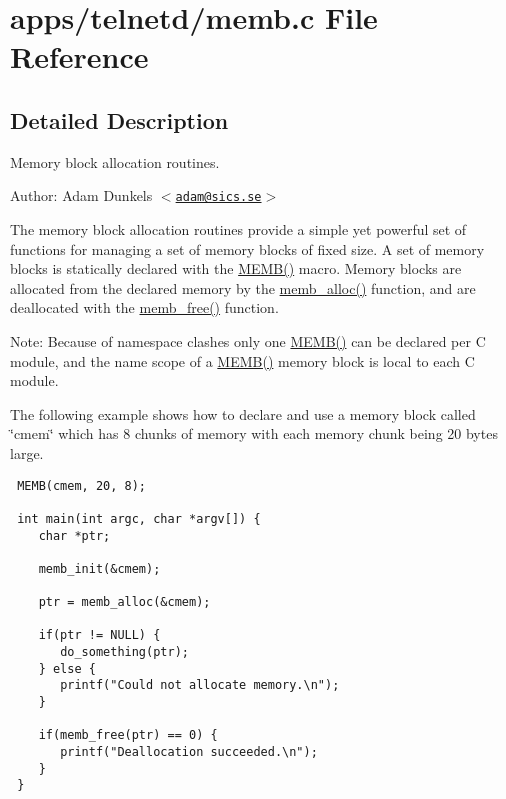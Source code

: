 \hypertarget{a00043}{
\section{apps/telnetd/memb.c File Reference}
\label{a00043}
}


\subsection{Detailed Description}
Memory block allocation routines. 

\begin{Desc}
\item[Author:]Adam Dunkels $<$\href{mailto:adam@sics.se}{\tt adam@sics.se}$>$\end{Desc}
The memory block allocation routines provide a simple yet powerful set of functions for managing a set of memory blocks of fixed size. A set of memory blocks is statically declared with the \hyperlink{a00060_g8457539d6a6eaecded820f4042b8314a}{MEMB()} macro. Memory blocks are allocated from the declared memory by the \hyperlink{a00060_g73bf7c370e6ada339f102d4c9768e48c}{memb\_\-alloc()} function, and are deallocated with the \hyperlink{a00060_g7174da2ea729ba661256d123f08ed272}{memb\_\-free()} function.

\begin{Desc}
\item[Note:]Because of namespace clashes only one \hyperlink{a00060_g8457539d6a6eaecded820f4042b8314a}{MEMB()} can be declared per C module, and the name scope of a \hyperlink{a00060_g8457539d6a6eaecded820f4042b8314a}{MEMB()} memory block is local to each C module.\end{Desc}
The following example shows how to declare and use a memory block called \char`\"{}cmem\char`\"{} which has 8 chunks of memory with each memory chunk being 20 bytes large.



\footnotesize\begin{verbatim} MEMB(cmem, 20, 8);

 int main(int argc, char *argv[]) {
    char *ptr;
    
    memb_init(&cmem);

    ptr = memb_alloc(&cmem);

    if(ptr != NULL) {
       do_something(ptr);
    } else {
       printf("Could not allocate memory.\n");
    }

    if(memb_free(ptr) == 0) {
       printf("Deallocation succeeded.\n");
    }
 }
\end{verbatim}
\normalsize
 

